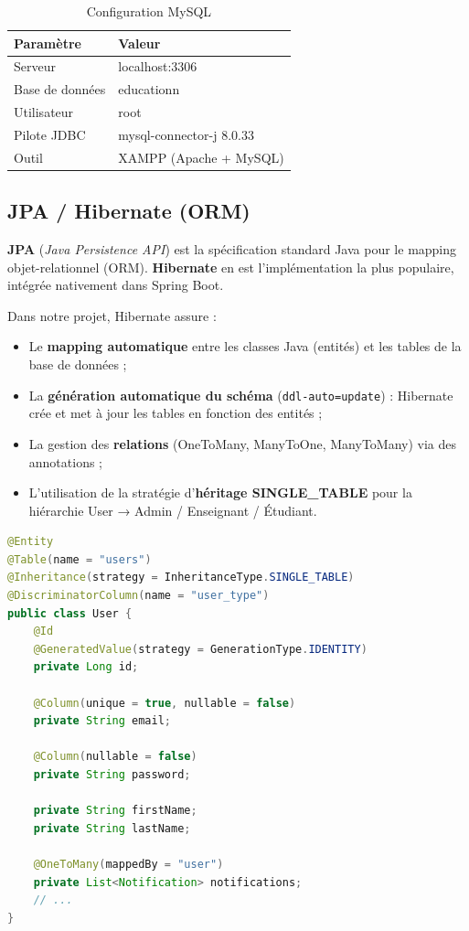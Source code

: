 \begin{table}[H]
\centering
\caption{Configuration MySQL}
\label{tab:mysql_config}
\begin{tabular}{ll}
\toprule
\textbf{Paramètre} & \textbf{Valeur} \\
\midrule
Serveur & localhost:3306 \\
Base de données & educationn \\
Utilisateur & root \\
Pilote JDBC & mysql-connector-j 8.0.33 \\
Outil & XAMPP (Apache + MySQL) \\
\bottomrule
\end{tabular}
\end{table}

\subsection{JPA / Hibernate (ORM)}

\textbf{JPA} (\textit{Java Persistence API}) est la spécification standard Java pour le mapping objet-relationnel (ORM). \textbf{Hibernate} en est l'implémentation la plus populaire, intégrée nativement dans Spring Boot.

\vspace{0.3cm}

Dans notre projet, Hibernate assure :
\begin{itemize}[noitemsep]
    \item Le \textbf{mapping automatique} entre les classes Java (entités) et les tables de la base de données ;
    \item La \textbf{génération automatique du schéma} (\texttt{ddl-auto=update}) : Hibernate crée et met à jour les tables en fonction des entités ;
    \item La gestion des \textbf{relations} (OneToMany, ManyToOne, ManyToMany) via des annotations ;
    \item L'utilisation de la stratégie d'\textbf{héritage SINGLE\_TABLE} pour la hiérarchie User → Admin / Enseignant / Étudiant.
\end{itemize}

\begin{lstlisting}[language=Java,caption={Exemple de mapping JPA — Entité User (extrait)}]
@Entity
@Table(name = "users")
@Inheritance(strategy = InheritanceType.SINGLE_TABLE)
@DiscriminatorColumn(name = "user_type")
public class User {
    @Id
    @GeneratedValue(strategy = GenerationType.IDENTITY)
    private Long id;

    @Column(unique = true, nullable = false)
    private String email;

    @Column(nullable = false)
    private String password;

    private String firstName;
    private String lastName;

    @OneToMany(mappedBy = "user")
    private List<Notification> notifications;
    // ...
}
\end{lstlisting}


